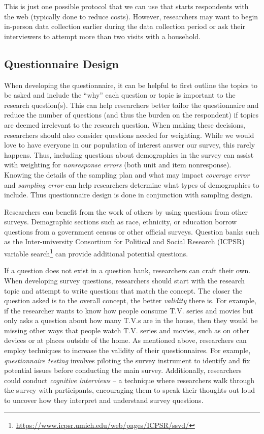 \documentclass[
]{krantz}
\renewcommand{\href}[2]{#2\footnote{\url{#1}}}
\begin{document}
This is just one possible protocol that we can use that starts respondents with the web (typically done to reduce costs). However, researchers may want to begin in-person data collection earlier during the data collection period or ask their interviewers to attempt more than two visits with a household.

\hypertarget{overview-design-questionnaire}{%
\subsection{Questionnaire Design}\label{overview-design-questionnaire}}

When developing the questionnaire, it can be helpful to first outline the topics to be asked and include the ``why'' each question or topic is important to the research question(s). This can help researchers better tailor the questionnaire and reduce the number of questions (and thus the burden on the respondent) if topics are deemed irrelevant to the research question. When making these decisions, researchers should also consider questions needed for weighting. While we would love to have everyone in our population of interest answer our survey, this rarely happens. Thus, including questions about demographics in the survey can assist with weighting for \emph{nonresponse errors} (both unit and item nonresponse). Knowing the details of the sampling plan and what may impact \emph{coverage error} and \emph{sampling error} can help researchers determine what types of demographics to include. Thus questionnaire design is done in conjunction with sampling design.

Researchers can benefit from the work of others by using questions from other surveys. Demographic sections such as race, ethnicity, or education borrow questions from a government census or other official surveys. Question banks such as the \href{https://www.icpsr.umich.edu/web/pages/ICPSR/ssvd/}{Inter-university Consortium for Political and Social Research (ICPSR) variable search} can provide additional potential questions.

If a question does not exist in a question bank, researchers can craft their own. When developing survey questions, researchers should start with the research topic and attempt to write questions that match the concept. The closer the question asked is to the overall concept, the better \emph{validity} there is. For example, if the researcher wants to know how people consume T.V. series and movies but only asks a question about how many T.V.s are in the house, then they would be missing other ways that people watch T.V. series and movies, such as on other devices or at places outside of the home. As mentioned above, researchers can employ techniques to increase the validity of their questionnaires. For example, \emph{questionnaire testing} involves piloting the survey instrument to identify and fix potential issues before conducting the main survey. Additionally, researchers could conduct \emph{cognitive interviews} -- a technique where researchers walk through the survey with participants, encouraging them to speak their thoughts out loud to uncover how they interpret and understand survey questions.
\end{document}
